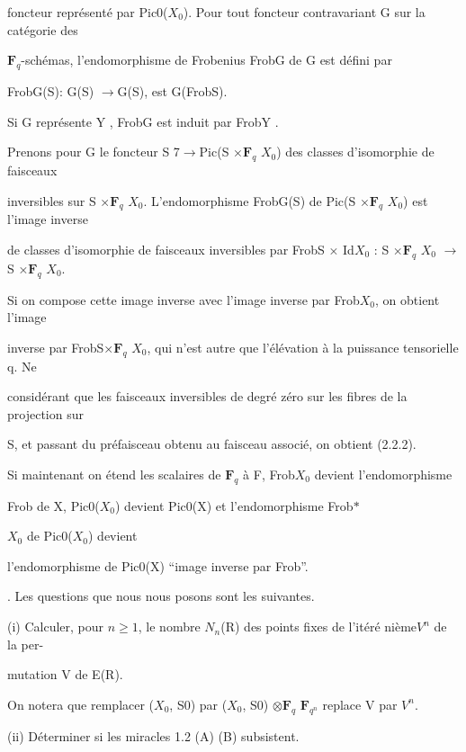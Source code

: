 \documentclass[11pt]{article}
\begin{document}
\noindent foncteur représenté par Pic0(\(X_0\)). Pour tout foncteur contravariant G sur la catégorie des\par
\noindent \(\mathbf F_q\)-schémas, l’endomorphisme de Frobenius FrobG de G est défini par\par
\noindent FrobG(S): G(S) \(\to\)G(S), est G(FrobS).\par
\noindent Si G représente Y , FrobG est induit par FrobY .\par
\noindent Prenons pour G le foncteur S 7\(\to\)Pic(S ×\(\mathbf F_q\) \(X_0\)) des classes d’isomorphie de faisceaux\par
\noindent inversibles sur S ×\(\mathbf F_q\) \(X_0\). L’endomorphisme FrobG(S) de Pic(S ×\(\mathbf F_q\) \(X_0\)) est l’image inverse\par
\noindent de classes d’isomorphie de faisceaux inversibles par FrobS × Id\(X_0\) : S ×\(\mathbf F_q\) \(X_0\) \(\to\)S ×\(\mathbf F_q\) \(X_0\).\par
\medskip
\noindent Si on compose cette image inverse avec l’image inverse par Frob\(X_0\), on obtient l’image\par
\noindent inverse par FrobS×\(\mathbf F_q\) \(X_0\), qui n’est autre que l’élévation à la puissance tensorielle q. Ne\par
\noindent considérant que les faisceaux inversibles de degré zéro sur les fibres de la projection sur\par
\noindent S, et passant du préfaisceau obtenu au faisceau associé, on obtient (2.2.2).\par
\noindent Si maintenant on étend les scalaires de \(\mathbf F_q\) à F, Frob\(X_0\) devient l’endomorphisme\par
\noindent Frob de X, Pic0(\(X_0\)) devient Pic0(X) et l’endomorphisme Frob\(*\)\par
\noindent \(X_0\) de Pic0(\(X_0\)) devient\par
\noindent l’endomorphisme de Pic0(X) “image inverse par Frob”.\par
{}. Les questions que nous nous posons sont les suivantes.\par
\noindent (i) Calculer, pour \(n\geq 1\), le nombre \(N_n\)(R) des points fixes de l’itéré nième\(V^n\) de la per-\par
\noindent mutation V de E(R).\par
\noindent On notera que remplacer (\(X_0\), S0) par (\(X_0\), S0) \(\otimes\)\(\mathbf F_q\) \(\mathbf F_{q^n}\) replace V par \(V^n\).\par
\noindent (ii) Déterminer si les miracles 1.2 (A) (B) subsistent.\par
\end{document}
